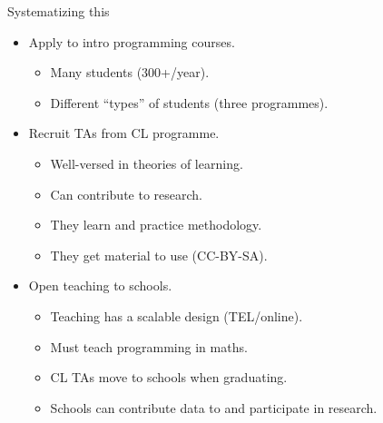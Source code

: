 \begin{frame}
  \begin{block}{Systematizing this}
    \begin{itemize}
      \item<+> Apply to intro programming courses.
        \begin{itemize}
          \item Many students (300+/year).
          \item Different \enquote{types} of students (three programmes).
        \end{itemize}
      \item<+> Recruit TAs from CL programme.
        \begin{itemize}
          \item Well-versed in theories of learning.
          \item Can contribute to research.
          \item They learn and practice methodology.
          \item They get material to use (CC-BY-SA).
        \end{itemize}
      \item<+> Open teaching to schools.
        \begin{itemize}
          \item Teaching has a scalable design (TEL/online).
          \item Must teach programming in maths.
          \item CL TAs move to schools when graduating.
          \item Schools can contribute data to and participate in research.
        \end{itemize}
    \end{itemize}
  \end{block}
\end{frame}
